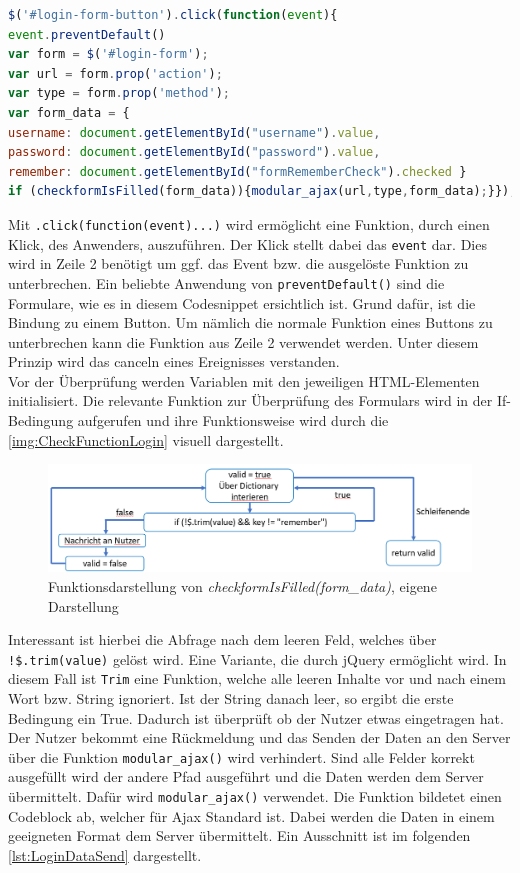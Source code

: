 \documentclass[a4paper,titlepage,halfparskip,12pt]{scrreprt}
\begin{document}
\begin{onehalfspacing}
\begin{lstlisting}[language=Javascript,caption=Angehängte Funktion an ein HTML-Element,label={lst:JSLoginButton}]
$('#login-form-button').click(function(event){
event.preventDefault()
var form = $('#login-form');
var url = form.prop('action');
var type = form.prop('method');
var form_data = {
username: document.getElementById("username").value,
password: document.getElementById("password").value,
remember: document.getElementById("formRememberCheck").checked }
if (checkformIsFilled(form_data)){modular_ajax(url,type,form_data);}});
\end{lstlisting}
Mit \texttt{.click(function(event){...})} wird ermöglicht eine Funktion, durch einen Klick, des Anwenders, auszuführen. Der Klick stellt dabei das \texttt{event} dar. Dies wird in Zeile 2 benötigt um ggf. das Event bzw. die ausgelöste Funktion zu unterbrechen. Ein beliebte Anwendung von \texttt{preventDefault()} sind die Formulare, wie es in diesem Codesnippet ersichtlich ist. Grund dafür, ist die Bindung zu einem Button. Um nämlich die normale Funktion eines Buttons zu unterbrechen kann die Funktion aus Zeile 2 verwendet werden. Unter diesem Prinzip wird das \glqq canceln\grqq{} eines Ereignisses verstanden. \cite{w3schoolsPrevDefault}\\
Vor der Überprüfung werden Variablen mit den jeweiligen \ac{HTML}-Elementen initialisiert. Die relevante Funktion zur Überprüfung des Formulars wird in der If-Bedingung aufgerufen und ihre Funktionsweise wird durch die \autoref{img:CheckFunctionLogin} visuell dargestellt.
\begin{figure}[h]
	\centering
	\includegraphics[scale=0.8]{images/FunktionUeberpruefenLogin}
	\caption{Funktionsdarstellung von \textit{checkformIsFilled(form\_data)}, eigene Darstellung}
	\label{img:CheckFunctionLogin}
\end{figure}
Interessant ist hierbei die Abfrage nach dem leeren Feld, welches über \texttt{!\$.trim(value)} gelöst wird. Eine Variante, die durch jQuery ermöglicht wird. In diesem Fall ist \texttt{Trim} eine Funktion, welche alle leeren Inhalte vor und nach einem Wort bzw. String ignoriert. Ist der String danach leer, so ergibt die erste Bedingung ein True. Dadurch ist überprüft ob der Nutzer etwas eingetragen hat. Der Nutzer bekommt eine Rückmeldung und das Senden der Daten an den Server über die Funktion \texttt{modular\_ajax()} wird verhindert. Sind alle Felder korrekt ausgefüllt wird der andere Pfad ausgeführt und die Daten werden dem Server übermittelt. Dafür wird \texttt{modular\_ajax()} verwendet. Die Funktion bildetet einen Codeblock ab, welcher für Ajax Standard ist. Dabei werden die Daten in einem geeigneten Format dem Server übermittelt. Ein Ausschnitt ist im folgenden \autoref{lst:LoginDataSend} dargestellt.

\end{onehalfspacing}
\end{document}
